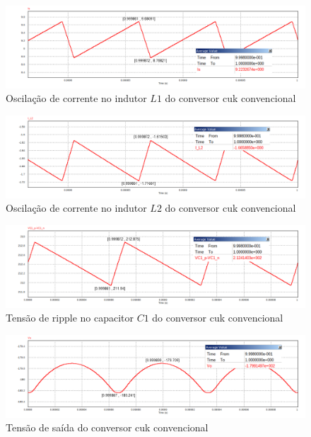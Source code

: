 \documentclass[
	12pt,				%
	openany,
	onseside,
	a4paper,			%
	english,			%
	french,				%
	spanish,			%
	brazil,				%
	]{abntex2}
\begin{document}
\begin{figure}[htb]%
	\centering
		\includegraphics[width= \linewidth]{cuk_conv_ripp_I_L1}
		\caption{Oscilação de corrente no indutor $L1$ do conversor cuk convencional}
		\label{fig:cuk_conv_ripp_I_L1}
\end{figure}

\begin{figure}[htb]%
	\centering
		\includegraphics[width= \linewidth]{cuk_conv_ripp_I_L2}
		\caption{Oscilação de corrente no indutor $L2$ do conversor cuk convencional}
		\label{fig:cuk_conv_ripp_I_L2}
\end{figure}

\begin{figure}[H]%
	\centering
		\includegraphics[width= \linewidth]{cuk_conv_ripp_V_C1}
		\caption{Tensão de ripple no capacitor $C1$ do conversor cuk convencional}
		\label{fig:cuk_conv_ripp_V_C1}
\end{figure}


\begin{figure}[H]%
	\centering
		\includegraphics[width= \linewidth]{cuk_conv_ripp_V_out2}
		\caption{Tensão de saída do conversor cuk convencional}
		\label{fig:cuk_conv_ripp_V_out_}
\end{figure}
\end{document}
